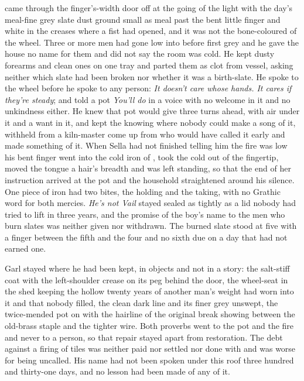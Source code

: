  came through the finger's-width door off  at the going of the light with the day's meal-fine grey slate dust ground small as meal past the bent little finger and white in the creases where a fist had opened, and it was not the bone-coloured  of the wheel. Three or more men had gone low into  before first grey and he gave the house no name for them and did not say the room was cold. He kept dusty forearms and clean ones on one tray and parted them as clot from vessel, asking neither which slate had been broken nor whether it was a birth-slate. He spoke to the wheel before he spoke to any person: \emph{It doesn't care whose hands. It cares if they're steady}; and told a pot \emph{You'll do} in a voice with no welcome in it and no unkindness either. He knew  that pot would give three turns ahead, with air under it and a want in it, and kept the knowing where nobody could make a song of it, withheld from a kiln-master come up from  who would have called it early and made something of it. When Sella had not finished telling him the fire was low his bent finger went into the cold iron of , took the cold out of the fingertip, moved the tongue a hair's breadth and was left standing, so that the end of her instruction arrived at the pot and the household straightened around his silence. One piece of iron had two bites, the holding and the taking, with no Grathic word for both mercies. \emph{He's not Vail} stayed sealed as tightly as a lid nobody had tried to lift in three years, and the promise of the boy's name to the men who burn slates was neither given nor withdrawn. The burned slate stood at five with a finger between the fifth and the four and no sixth due on a day that had not earned one.

Garl stayed where he had been kept, in objects and not in a story: the salt-stiff coat with the left-shoulder crease on its peg behind the door, the wheel-seat in the shed keeping the hollow twenty years of another man's weight had worn into it and that nobody filled, the clean dark line and its finer grey unswept, the twice-mended pot on  with the hairline of the original break showing between the old-brass staple and the tighter wire. Both proverbs went to the pot and the fire and never to a person, so that repair stayed apart from restoration. The debt against a firing of tiles was neither paid nor settled nor done with and was worse for being uncalled. His name had not been spoken under this roof three hundred and thirty-one days, and no lesson had been made of any of it.

